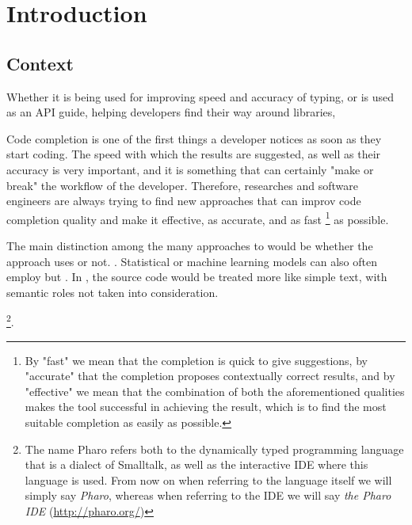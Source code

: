 \chapter{Introduction}
\label{chap:Introduction}

\section{Context}
\label{sec:Introduction-Context}
 Whether it is being used for improving speed and accuracy of typing, or is used as an API guide, helping developers find their way around libraries, 

Code completion is  one of the first things a developer notices as soon as they start coding. The speed with which the results are suggested, as well as their accuracy is very important, and it is something that can certainly "make or break" the workflow of the developer. Therefore, researches and software engineers are always trying to find new approaches that can improv code completion quality and make it  effective, as accurate, and as fast \footnote{By "fast" we mean that the completion is quick to give suggestions, by "accurate" that the completion proposes contextually correct results, and by "effective" we mean that the combination of both the aforementioned qualities makes the tool successful in achieving the result, which is to find the most suitable completion as easily as possible.} as possible.

The main distinction among the many approaches to  would be whether the approach uses  or not. . Statistical or machine learning models can also often employ  but . In , the source code would be treated more like simple text, with semantic roles not taken into consideration.

 \footnote{The name Pharo refers both to the dynamically typed programming language that is a dialect of Smalltalk, as well as the interactive IDE where this language is used.  \newline From now on when referring to the language itself we will simply say \textit{Pharo}, whereas when referring to the IDE we will say \textit{the Pharo IDE} (\url{http://pharo.org/})}.

